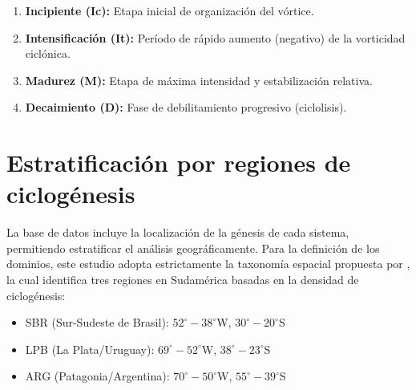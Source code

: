\begin{enumerate}
    \item \textbf{Incipiente (Ic):} Etapa inicial de organización del vórtice.
    \item \textbf{Intensificación (It):} Período de rápido aumento (negativo) de la vorticidad ciclónica.
    \item \textbf{Madurez (M):} Etapa de máxima intensidad y estabilización relativa.
    \item \textbf{Decaimiento (D):} Fase de debilitamiento progresivo (ciclolisis).
\end{enumerate}


\section{Estratificación por regiones de ciclogénesis}\label{sec:regiones_ciclogenesis}

La base de datos incluye la localización de la génesis de cada sistema, permitiendo estratificar el análisis geográficamente. Para la definición de los dominios, este estudio adopta estrictamente la taxonomía espacial propuesta por \citet{gramcianinov2019properties}, la cual identifica tres regiones en Sudamérica basadas en la densidad de ciclogénesis:

\begin{itemize}
    \item SBR (Sur-Sudeste de Brasil): $52^\circ-38^\circ$W, $30^\circ-20^\circ$S
    \item LPB (La Plata/Uruguay): $69^\circ-52^\circ$W, $38^\circ-23^\circ$S
    \item ARG (Patagonia/Argentina): $70^\circ-50^\circ$W, $55^\circ-39^\circ$S
\end{itemize}

